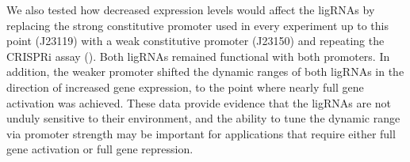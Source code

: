 \documentclass[10pt,oneside]{article}
\begin{document}
We also tested how decreased expression levels would affect the ligRNAs by replacing the strong constitutive promoter used in every experiment up to this point (J23119) with a weak constitutive promoter (J23150) and repeating the CRISPRi assay (). Both ligRNAs remained functional with both promoters.  In addition, the weaker promoter shifted the dynamic ranges of both ligRNAs in the direction of increased gene expression, to the point where nearly full gene activation was achieved.  These data provide evidence that the ligRNAs are not unduly sensitive to their environment, and the ability to tune the dynamic range via promoter strength may be important for applications that require either full gene activation or full gene repression.


\end{document}
